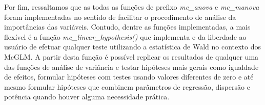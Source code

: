 Por fim, ressaltamos que as todas as funções de prefixo \emph{mc\_anova} e \emph{mc\_manova} foram implementadas no sentido de facilitar o procedimento de análise da importâncias das variáveis. Contudo, dentre as funções implementadas, a mais flexível é a função \emph{mc\_linear\_hypothesis()} que implementa e da liberdade ao usuário de efetuar qualquer teste utilizando a estatística de Wald no contexto dos McGLM. A partir desta função é possível replicar os resultados de qualquer uma das funções de análise de variância e testar hipóteses mais gerais como igualdade de efeitos, formular hipóteses com testes usando valores diferentes de zero e até mesmo formular hipóteses que combinem parâmetros de regressão, dispersão e potência quando houver alguma necessidade prática.
